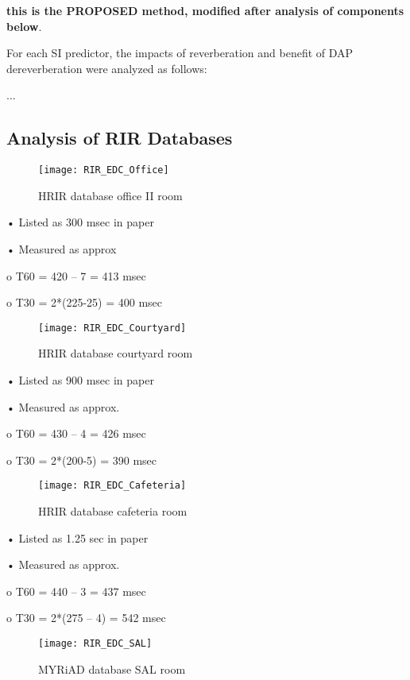 \textbf{this is the PROPOSED method, modified after analysis of components below}.

For each SI predictor, the impacts of reverberation and benefit of DAP dereverberation were analyzed as follows:

...



\subsection{Analysis of RIR Databases}




\begin{figure}[H]
	\texttt{[image: RIR\_EDC\_Office]}
	\centering
	\caption{HRIR database office II room}
	\label{fig:RIR_EDC_Office}
\end{figure}

•	Listed as 300 msec in paper

•	Measured as approx 

o	T60 = 420 – 7 = 413 msec

o	T30 = 2*(225-25) = 400 msec 



\begin{figure}[H]
	\texttt{[image: RIR\_EDC\_Courtyard]}
	\centering
	\caption{HRIR database courtyard room}
	\label{fig:RIR_EDC_Courtyard}
\end{figure}

•	Listed as 900 msec in paper

•	Measured as approx. 

o	T60 = 430 – 4 = 426 msec

o	T30 = 2*(200-5) = 390 msec


\begin{figure}[H]
	\texttt{[image: RIR\_EDC\_Cafeteria]}
	\centering
	\caption{HRIR database cafeteria room}
	\label{fig:RIR_EDC_Cafeteria}
\end{figure}

•	Listed as 1.25 sec in paper

•	Measured as approx. 

o	T60 = 440 – 3 = 437 msec

o	T30 = 2*(275 – 4) = 542 msec


\begin{figure}[H]
	\texttt{[image: RIR\_EDC\_SAL]}
	\centering
	\caption{MYRiAD database SAL room}
	\label{fig:RIR_EDC_SAL}
\end{figure}


